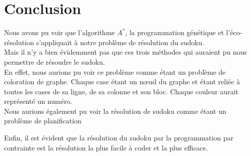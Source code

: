 \chapter{Conclusion}
   
Nous avons pu voir que l'algorithme $A^{*}$, la programmation génétique et l'éco-résolution s'appliquait à notre problème de résolution du sudoku. \\
Mais il n'y a bien évidemment pas que ces trois méthodes qui auraient pu nous permettre de résoudre le sudoku. \\
En effet, nous aurions pu voir ce problème comme étant un problème de coloration de graphe. Chaque case étant un nœud du graphe et étant reliée à toutes les cases de sa ligne, de sa colonne et son bloc. Chaque couleur aurait représenté un numéro. \\
Nous aurions également pu voir la résolution de sudoku comme étant un problème de planification 

Enfin, il est évident que la résolution du sudoku par la programmation par contrainte est la résolution la plus facile à coder et la plus efficace.